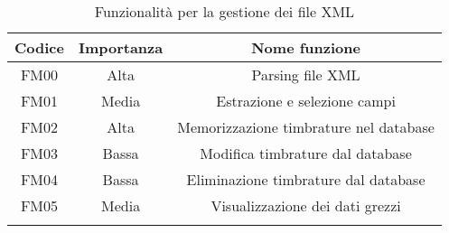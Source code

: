 \setlength{\extrarowheight}{7pt}
\begin{longtable}{|c|c|c|}
\hline 
\textbf{Codice} & \textbf{Importanza} & \textbf{Nome funzione}
\tabularnewline
\hline
FM00 &	Alta 	&	Parsing file XML\tabularnewline
FM01 &	Media 	&	Estrazione e selezione campi\tabularnewline
FM02 &	Alta 	&	Memorizzazione timbrature nel database\tabularnewline
FM03 &	Bassa	&	Modifica timbrature dal database\tabularnewline
FM04 &	Bassa	&	Eliminazione timbrature dal database\tabularnewline
FM05 &	Media	&	Visualizzazione dei dati grezzi\tabularnewline
\hline
\caption{Funzionalità per la gestione dei file XML}
\label{tab:GestioneXML}
\end{longtable}